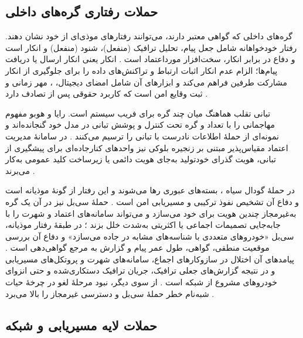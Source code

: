 \documentclass[12pt,a4paper]{article}
\begin{document}
\subsection{حملات رفتاری گره‌های داخلی}

گره‌های داخلی که گواهی معتبر دارند، می‌توانند رفتار‌های موذی‌ای از خود نشان دهند. رفتار خودخواهانه  شامل جعل پیام، تحلیل ترافیک (منفعل)، شنود (منفعل) و انکار است و دفاع در برابر انکار، سخت‌افزار مورداعتماد است \cite{farsimadanReviewSecurityChallenges2025}. انکار  یعنی انکار ارسال یا دریافت پیام‌ها؛ الزام عدم انکار اثبات ارتباط و تراکنش‌های داده را برای جلوگیری از انکار مشارکت طرفین فراهم می‌کند و ابزار‌های آن شامل امضای دیجیتال، ، مهر زمانی و ثبت وقایع امن است که کاربرد حقوقی پس از تصادف دارد \cite{VanetSecurityPrivacy}.

تبانی  تقلب هماهنگ میان چند گره برای فریب سیستم است. رایا و هوبو مفهوم مهاجمانی را با تعداد  و  گره تحت کنترل و پوشش تبانی در مدل خود گنجانده‌اند و نمونه‌ای از حملهٔ اطلاعات نادرست با تبانی را ترسیم می‌کنند \cite{SecuringVehicularAd}. در سامانهٔ مدیریت اعتماد مقیاس‌پذیر مبتنی بر زنجیره بلوکی نیز واحد‌های کنارجاده‌ای برای پیشگیری از تبانی، هویت گذرای خودتولید به‌جای هویت دائمی یا زیرساخت کلید عمومی به‌کار می‌برند \cite{ghovanlooyghajarSBTMSScalableBlockchain2021}.

در حملهٔ گودال سیاه ، بسته‌های عبوری رها می‌شوند و این رفتار از گونهٔ موذیانه است و دفاع آن تشخیص نفوذ ترکیبی و مسیریابی امن است \cite{farsimadanReviewSecurityChallenges2025}. حملهٔ سی‌بل  نیز در آن یک گره به‌غیرمجاز چندین هویت برای خود می‌سازد و می‌تواند سامانه‌های اعتماد و شهرت را با جابه‌جایی تصمیمات اجماعی یا اکثریتی به‌شدت خلل بزند \cite{VanetSecurityPrivacy}؛ در طبقهٔ رفتار موذیانه، سی‌بل «خودرو‌های متعددی با شناسه‌های مشابه در جاده می‌سازد» و دفاع آن بررسی موقعیت منطقی، گواهی، طول عمر پیام و گزارش به مرجع گواهی‌دهی است \cite{farsimadanReviewSecurityChallenges2025}. پیامد‌های آن اختلال در سازوکار‌های اجماع، سامانه‌های شهرت و پروتکل‌های مسیریابی و در نتیجه گزارش‌های جعلی ترافیک، جریان ترافیک دستکاری‌شده و حتی انزوای خودرو‌های مشروع از شبکه است \cite{VanetSecurityPrivacy}. از سوی دیگر، نبود مرحلهٔ لغو در چرخهٔ حیات شبه‌نام خطر حملهٔ سی‌بل و دسترسی غیرمجاز را بالا می‌برد \cite{rahmawatiagustinaSystematicLiteratureReview2025}.

\subsection{حملات لایه مسیریابی و شبکه}
\end{document}
